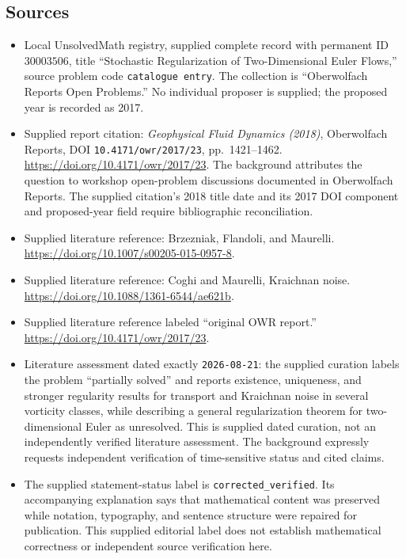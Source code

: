 \documentclass[11pt]{article}
\begin{document}
\subsection{Sources}
\begin{itemize}
\item Local UnsolvedMath registry, supplied complete record with permanent ID \(30003506\), title ``Stochastic Regularization of Two-Dimensional Euler Flows,'' source problem code \texttt{catalogue entry}. The collection is ``Oberwolfach Reports Open Problems.'' No individual proposer is supplied; the proposed year is recorded as 2017.
\item Supplied report citation: \emph{Geophysical Fluid Dynamics (2018)}, Oberwolfach Reports, DOI \texttt{10.4171/owr/2017/23}, pp.\ 1421--1462. \url{https://doi.org/10.4171/owr/2017/23}. The background attributes the question to workshop open-problem discussions documented in Oberwolfach Reports. The supplied citation's 2018 title date and its 2017 DOI component and proposed-year field require bibliographic reconciliation.
\item Supplied literature reference: Brzezniak, Flandoli, and Maurelli. \url{https://doi.org/10.1007/s00205-015-0957-8}.
\item Supplied literature reference: Coghi and Maurelli, Kraichnan noise. \url{https://doi.org/10.1088/1361-6544/ae621b}.
\item Supplied literature reference labeled ``original OWR report.'' \url{https://doi.org/10.4171/owr/2017/23}.
\item Literature assessment dated exactly \texttt{2026-08-21}: the supplied curation labels the problem ``partially solved'' and reports existence, uniqueness, and stronger regularity results for transport and Kraichnan noise in several vorticity classes, while describing a general regularization theorem for two-dimensional Euler as unresolved. This is supplied dated curation, not an independently verified literature assessment. The background expressly requests independent verification of time-sensitive status and cited claims.
\item The supplied statement-status label is \texttt{corrected\_verified}. Its accompanying explanation says that mathematical content was preserved while notation, typography, and sentence structure were repaired for publication. This supplied editorial label does not establish mathematical correctness or independent source verification here.
\end{itemize}
\end{document}
